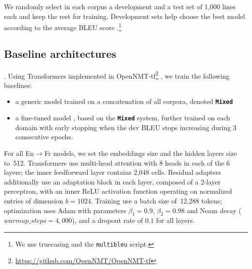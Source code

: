 \documentclass[11pt,a4paper]{article}
\newcommand{\fyDone}[1]{\done[FY]\Todo[FY:]{\textcolor{orange}{#1}}}
\newcommand{\fyFuture}[1]{\done[FY]\Todo[FY:]{\textcolor{red}{#1}}}
\newcommand{\system}[1]{\texttt{\textbf{#1}}}
\begin{document}
We randomly select in each corpus a development and a test set of 1,000 lines each and keep the rest for training. Development sets help choose the best model according to the average BLEU score \cite{Papineni02bleu}.\footnote{We use truecasing and the \texttt{multibleu} script.}\fyDone{A word about meta-parameter settings}
\fyFuture{Is this part on significance testing still accurate ?}

\subsection{Baseline architectures \label{ssec:baseline}}
\fyDone{Write this - settings and parameters for Mixed and Full-FT}.
Using Transformers \cite{Vaswani17attention} implemented in OpenNMT-tf\footnote{\url{https://github.com/OpenNMT/OpenNMT-tf}} \cite{Klein17opennmt}, we train the following baselines:
\begin{itemize}
\item a generic model trained on a concatenation of all corpora, denoted \system{Mixed}\fyDone{Or mixed nat ?}
\item a fine-tuned model \cite{Luong15stanford,Freitag16fast}, based on the \system{Mixed} system, further trained on each domain with early stopping when the dev BLEU stops increasing during 3 consecutive epochs.
\end{itemize}

For all En$\rightarrow$Fr models, we set the embeddings size and the hidden layers size to~512. Transformers use multi-head attention with 8 heads in each of the 6 layers; the inner feedforward layer contains 2,048 cells. Residual adapters additionally use an adaptation block in each layer, composed of a 2-layer perceptron, with an inner ReLU activation function operating on normalized entries of dimension $b=1024$.
Training use a batch size of~12,288 tokens; optimization uses Adam with parameters $\beta_1=0.9$, $\beta_2= 0.98$ and Noam decay ($warmup\_steps=4,000$), and a dropout rate of $0.1$ for all layers.\fyDone{Describe the block adaptation layer - voir slides}
\end{document}
